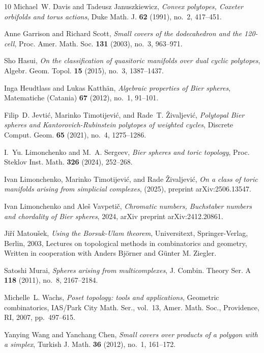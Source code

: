 \documentclass[11pt]{amsart}
\theoremstyle{plain}
\numberwithin{equation}{section}
\theoremstyle{definition}
\begin{document}
\begin{thebibliography}{10}
Michael~W. Davis and Tadeusz Januszkiewicz, \emph{Convex polytopes, {C}oxeter
  orbifolds and torus actions}, Duke Math. J. \textbf{62} (1991), no.~2,
  417--451. 

Anne Garrison and Richard Scott, \emph{Small covers of the dodecahedron and the
  120-cell}, Proc. Amer. Math. Soc. \textbf{131} (2003), no.~3, 963--971.

Sho Hasui, \emph{On the classification of quasitoric manifolds over dual cyclic
  polytopes}, Algebr. Geom. Topol. \textbf{15} (2015), no.~3, 1387--1437.

Inga Heudtlass and Lukas Katth\"an, \emph{Algebraic properties of {B}ier
  spheres}, Matematiche (Catania) \textbf{67} (2012), no.~1, 91--101.

Filip~D. Jevti\'c, Marinko Timotijevi\'c, and Rade~T. \v{Z}ivaljevi\'c,
  \emph{Polytopal {B}ier spheres and {K}antorovich-{R}ubinstein polytopes of
  weighted cycles}, Discrete Comput. Geom. \textbf{65} (2021), no.~4,
  1275--1286. 

I.~Yu. Limonchenko and M.~A. Sergeev, \emph{Bier spheres and toric topology},
  Proc. Steklov Inst. Math. \textbf{326} (2024), 252--268. 

Ivan Limonchenko, Marinko Timotijevi{\'c}, and Rade {\v{Z}}ivaljevi{\'c},
  \emph{On a class of toric manifolds arising from simplicial complexes},
  (2025), preprint arXiv:2506.13547.

Ivan Limonchenko and Aleš Vavpetič, \emph{Chromatic numbers, {B}uchstaber
  numbers and chordality of {B}ier spheres}, 2024, arXiv preprint
  arXiv:2412.20861.

Ji\v{r}\'i Matou\v{s}ek, \emph{Using the {B}orsuk-{U}lam theorem},
  Universitext, Springer-Verlag, Berlin, 2003, Lectures on topological methods
  in combinatorics and geometry, Written in cooperation with Anders Bj\"orner
  and G\"unter M. Ziegler. 

Satoshi Murai, \emph{Spheres arising from multicomplexes}, J. Combin. Theory
  Ser. A \textbf{118} (2011), no.~8, 2167--2184. 

Michelle~L. Wachs, \emph{Poset topology: tools and applications}, Geometric
  combinatorics, IAS/Park City Math. Ser., vol.~13, Amer. Math. Soc.,
  Providence, RI, 2007, pp.~497--615. 

Yanying Wang and Yanchang Chen, \emph{Small covers over products of a polygon
  with a simplex}, Turkish J. Math. \textbf{36} (2012), no.~1, 161--172.

\end{thebibliography}
\end{document}
